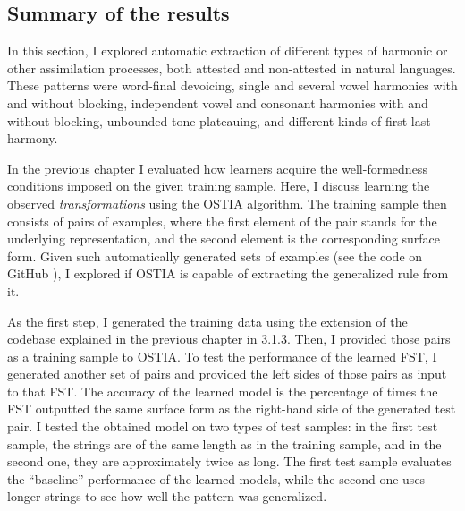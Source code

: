 \subsection{Summary of the results}

In this section, I explored automatic extraction of different types of harmonic or other assimilation processes, both attested and non-attested in natural languages.
These patterns were word-final devoicing, single and several vowel harmonies with and without blocking, independent vowel and consonant harmonies with and without blocking, unbounded tone plateauing, and different kinds of first-last harmony.


In the previous chapter I evaluated how learners acquire the well-formedness conditions imposed on the given training sample.
Here, I discuss learning the observed \emph{transformations} using the OSTIA algorithm.
The training sample then consists of pairs of examples, where the first element of the pair stands for the underlying representation, and the second element is the corresponding surface form.
Given such automatically generated sets of examples (see the code on GitHub \href{https://github.com/alenaks/subregular-experiments}{\faGithub} \citep{GHsubex}), I explored if OSTIA is capable of extracting the generalized rule from it.


As the first step, I generated the training data using the extension of the codebase explained in the previous chapter in 3.1.3.
Then, I provided those pairs as a training sample to OSTIA.
To test the performance of the learned FST, I generated another set of pairs and provided the left sides of those pairs as input to that FST.
The accuracy of the learned model is the percentage of times the FST outputted the same surface form as the right-hand side of the generated test pair.
I tested the obtained model on two types of test samples: in the first test sample, the strings are of the same length as in the training sample, and in the second one, they are approximately twice as long.
The first test sample evaluates the ``baseline'' performance of the learned models, while the second one uses longer strings to see how well the pattern was generalized.



